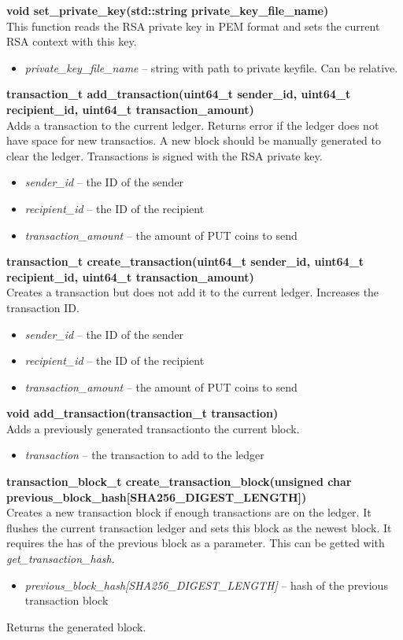 \documentclass{article}
\begin{document}
\textbf{void set\_private\_key(std::string private\_key\_file\_name)} \\
This function reads the RSA private key in PEM format and sets the current RSA context with this key.
\begin{itemize}
\item \textit{private\_key\_file\_name} -- string with path to private keyfile. Can be relative.
\end{itemize}

\textbf{transaction\_t add\_transaction(uint64\_t sender\_id, uint64\_t recipient\_id, uint64\_t transaction\_amount)} \\
Adds a transaction to the current ledger. Returns error if the ledger does not have space for new transactios. A new block should be manually generated to clear the ledger. Transactions is signed with the RSA private key.
\begin{itemize}
\item \textit{sender\_id} -- the ID of the sender
\item \textit{recipient\_id} -- the ID of the recipient
\item \textit{transaction\_amount} -- the amount of PUT coins to send
\end{itemize}

\textbf{transaction\_t create\_transaction(uint64\_t sender\_id, uint64\_t recipient\_id, uint64\_t transaction\_amount)} \\
Creates a transaction but does not add it to the current ledger. Increases the transaction ID.
\begin{itemize}
    \item \textit{sender\_id} -- the ID of the sender
    \item \textit{recipient\_id} -- the ID of the recipient
    \item \textit{transaction\_amount} -- the amount of PUT coins to send
\end{itemize}

\textbf{void add\_transaction(transaction\_t transaction)} \\
Adds a previously generated transactionto the current block.
\begin{itemize}
    \item \textit{transaction} -- the transaction to add to the ledger
\end{itemize}

\textbf{transaction\_block\_t create\_transaction\_block(unsigned char previous\_block\_hash[SHA256\_DIGEST\_LENGTH])} \\
Creates a new transaction block if enough transactions are on the ledger. It flushes the current transaction ledger and sets this block as the newest block.
It requires the has of the previous block as a parameter. This can be getted with \textit{get\_transaction\_hash}.
\begin{itemize}
    \item \textit{previous\_block\_hash[SHA256\_DIGEST\_LENGTH]} -- hash of the previous transaction block
\end{itemize}
Returns the generated block. \\ \par
\end{document}
